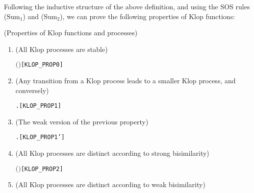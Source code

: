 Following the inductive structure of the above definition,
  and using the SOS rules
  ($\mathrm{Sum}_1$) and ($\mathrm{Sum}_2$), we can prove
the following properties of Klop functions:
\begin{proposition}{(Properties of Klop functions and processes)}
\begin{enumerate}
\item (All Klop processes are stable)
\begin{alltt}
\HOLTokenTurnstile{}  \ensuremath{(}  \ensuremath{)}\hfill[KLOP_PROP0]
\end{alltt}
\item (Any transition from a Klop process leads to a smaller Klop
  process, and conversely)
\begin{alltt}
\HOLTokenTurnstile{}    \HOLTokenTransBegin{} \HOLTokenTransEnd {} \HOLSymConst{\HOLTokenEquiv{}} \HOLSymConst{\HOLTokenExists{}}.  \HOLSymConst{\HOLTokenLt{}}  \HOLSymConst{\HOLTokenConj{}}  \HOLSymConst{\ensuremath{=}}   \hfill{[KLOP_PROP1]}
\end{alltt}
\item (The weak version of the previous property)
\begin{alltt}
\HOLTokenTurnstile{}    \HOLTokenWeakTransBegin{} \HOLTokenWeakTransEnd {} \HOLSymConst{\HOLTokenEquiv{}} \HOLSymConst{\HOLTokenExists{}}.  \HOLSymConst{\HOLTokenLt{}}  \HOLSymConst{\HOLTokenConj{}}  \HOLSymConst{\ensuremath{=}}   \hfill{[KLOP_PROP1']}
\end{alltt}
\item (All Klop processes are distinct according to strong bisimilarity)
\begin{alltt}
\HOLTokenTurnstile{}  \HOLSymConst{\HOLTokenLt{}}  \HOLSymConst{\HOLTokenImp{}} \HOLSymConst{\HOLTokenNeg{}}\ensuremath{(}   \HOLSymConst{\HOLTokenStrongEQ}   \ensuremath{)}\hfill{[KLOP_PROP2]}
\end{alltt}
\item (All Klop processes are distinct according to weak bisimilarity)

\end{enumerate}
\end{proposition}
